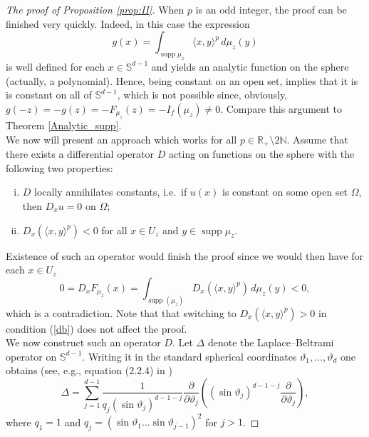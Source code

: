 \documentclass[11pt, leqno]{amsart}
\def\theta{\vartheta}
\theoremstyle{definition}
\numberwithin{equation}{section}
\begin{document}
\begin{proof}[The proof of Proposition \ref{prop:II}]
When $p$ is an odd integer, the proof can be finished very quickly. Indeed, in this case the expression  $$ g(x) = \int_{ \operatorname{supp} \mu_z  }  \langle x, y \rangle^p  \, d \mu_z(y)$$  is well defined for each $x\in \mathbb S^{d-1}$ and yields an  analytic function on the sphere (actually, a polynomial). Hence, being constant on an open set, implies that it is is constant on all of $\mathbb S^{d-1}$, which is not possible since, obviously, $ g(-z) = - g(z) = - F_{\mu_z} (z) = - I_f (\mu_z) \neq 0$.  Compare this argument to Theorem \ref{Analytic_supp}.   \\

We now will present an approach which works for all $p\in \mathbb R_+ \setminus 2 \mathbb N$. Assume that there exists a differential operator $D$ acting on functions on the sphere with the following two properties:
\begin{enumerate}[(i)]
\item\label{da} $D$ locally annihilates constants, i.e.\ if $u(x)$ is constant on some open set $\Omega$, then $D_x u = 0$ on $\Omega$;
\item\label{db} $D_x  \left(  \langle x, y \rangle^p \right) < 0$  for all  $x\in U_z $ and  $y \in \operatorname{supp} \mu_z  $. 
\end{enumerate}

Existence of such an operator would finish the proof since we would then have for each $x\in U_z$
\begin{equation}\label{e.4.17}
0 = D_x F_{\mu_z } (x) =  \int_{ \operatorname{supp}(\mu_z )} D_x  \left(  \langle x, y \rangle^p  \right) \, d \mu_z(y) <0,
\end{equation}
which is a contradiction. Note that that switching to $D_x  \left(  \langle x, y \rangle^p \right) > 0$ in condition (\ref{db}) does not affect the proof. \\

We now construct such an operator $D$. Let $\Delta$ denote the Laplace--Beltrami operator on $\mathbb S^{d-1}$. Writing it in the standard spherical coordinates $\theta_1,\dots,\theta_{d}$ one obtains (see, e.g., equation (2.2.4) in \cite{KMR})
\begin{equation}\label{e.4.18}
 \Delta = \sum_{j=1}^{d-1} \frac{1}{q_j (\sin \theta_j )^{d-1-j} } \frac{\partial}{\partial \theta_j}  \left(  (\sin \theta_j )^{d-1-j}  \frac{\partial}{\partial \theta_j}  \right),
 \end{equation}
  where $q_1 =1 $ and $q_j = (\sin \theta_1 \dots \sin \theta_{j-1})^2$ for $j>1$.


\end{proof}
\end{document}
